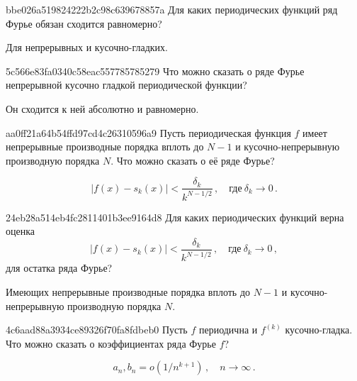 \begin{note}{bbe026a519824222b2c98c639678857a}
    Для каких периодических функций ряд Фурье обязан сходится равномерно?

    \begin{cloze}{1}
        Для непрерывных и кусочно-гладких.
    \end{cloze}
\end{note}

\begin{note}{5c566e83fa0340c58eac557785785279}
    Что можно сказать о ряде Фурье непрерывной кусочно гладкой периодической функции?

    \begin{cloze}{1}
        Он сходится к ней абсолютно и равномерно.
    \end{cloze}
\end{note}

\begin{note}{aa0ff21a64b54ffd97cd4c26310596a9}
    Пусть периодическая функция \({ f }\) имеет непрерывные производные порядка вплоть до \({ N - 1 }\) и кусочно-непрерывную производную порядка \({ N }\).
    Что можно сказать о её ряде Фурье?

    \begin{cloze}{1}
        \[
            \left\lvert f(x) - s_k(x) \right\rvert < \frac{\delta_k}{k^{N - 1/2}}\,, \quad \text{где}\ \delta_k \to 0\,.
        \]
    \end{cloze}
\end{note}

\begin{note}{24eb28a514eb4fc2811401b3ee9164d8}
    Для каких периодических функций верна оценка
    \[
        \left\lvert f(x) - s_k(x) \right\rvert < \frac{\delta_k}{k^{N - 1/2}}\,, \quad \text{где}\ \delta_k \to 0\,,
    \]
    для остатка ряда Фурье?

    \begin{cloze}{1}
        Имеющих непрерывные производные порядка вплоть до \({ N - 1 }\) и кусочно-непрерывную производную порядка \({ N }\).
    \end{cloze}
\end{note}

\begin{note}{4c6aad88a3934ce89326f70fa8fdbeb0}
    Пусть \({ f }\) периодична и \({ f^{(k)} }\) кусочно-гладка.
    Что можно сказать о коэффициентах ряда Фурье \({ f }\)?

    \begin{cloze}{1}
        \[
            a_n, b_n = o(1 / n^{k+1})\,, \quad n \to \infty\,.
        \]
    \end{cloze}
\end{note}

